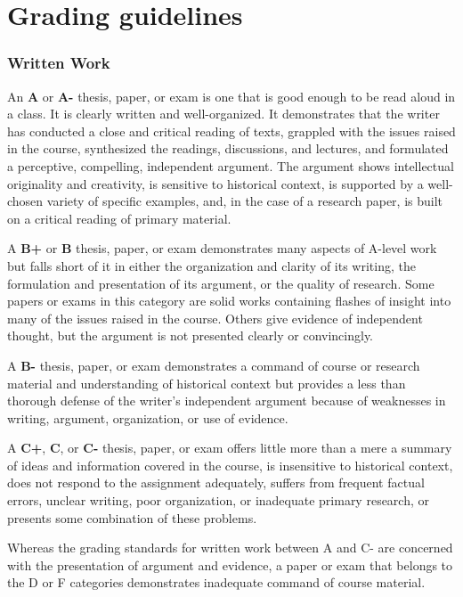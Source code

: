 \clearpage

\section{Grading guidelines}

\subsubsection{Written Work}

An \textbf{A} or \textbf{A-} thesis, paper, or exam is one that is good
enough to be read aloud in a class. It is clearly written and
well-organized. It demonstrates that the writer has conducted a close
and critical reading of texts, grappled with the issues raised in the
course, synthesized the readings, discussions, and lectures, and
formulated a perceptive, compelling, independent argument. The argument
shows intellectual originality and creativity, is sensitive to
historical context, is supported by a well-chosen variety of specific
examples, and, in the case of a research paper, is built on a critical
reading of primary material.

A \textbf{B+} or \textbf{B} thesis, paper, or exam demonstrates many
aspects of A-level work but falls short of it in either the organization
and clarity of its writing, the formulation and presentation of its
argument, or the quality of research. Some papers or exams in this
category are solid works containing flashes of insight into many of the
issues raised in the course. Others give evidence of independent
thought, but the argument is not presented clearly or convincingly.

A \textbf{B-} thesis, paper, or exam demonstrates a command of course or
research material and understanding of historical context but provides a
less than thorough defense of the writer's independent argument because
of weaknesses in writing, argument, organization, or use of evidence.

A \textbf{C+}, \textbf{C}, or \textbf{C-} thesis, paper, or exam offers
little more than a mere a summary of ideas and information covered in
the course, is insensitive to historical context, does not respond to
the assignment adequately, suffers from frequent factual errors, unclear
writing, poor organization, or inadequate primary research, or presents
some combination of these problems.

Whereas the grading standards for written work between A and C- are
concerned with the presentation of argument and evidence, a paper or
exam that belongs to the D or F categories demonstrates inadequate
command of course material.

